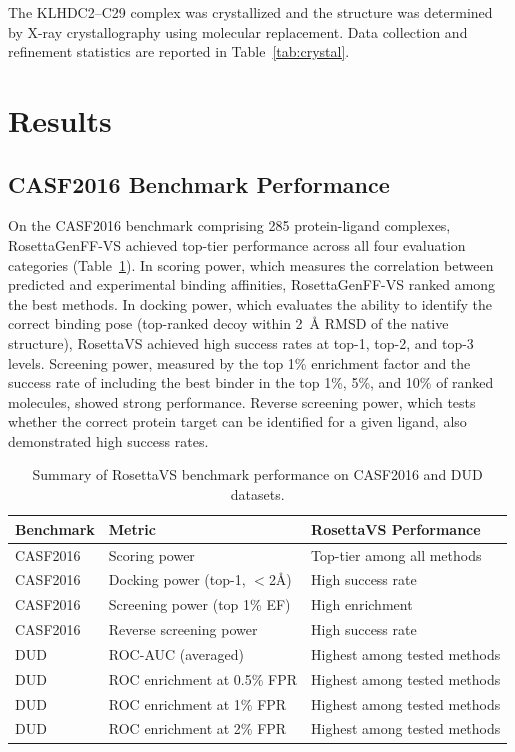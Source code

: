 \documentclass[12pt]{article}
\begin{document}
The KLHDC2--C29 complex was crystallized and the structure was determined by X-ray crystallography using molecular replacement. Data collection and refinement statistics are reported in Table~\ref{tab:crystal}.

\section{Results}

\subsection{CASF2016 Benchmark Performance}

On the CASF2016 benchmark comprising 285 protein-ligand complexes, RosettaGenFF-VS achieved top-tier performance across all four evaluation categories (Table~\ref{tab:casf}). In scoring power, which measures the correlation between predicted and experimental binding affinities, RosettaGenFF-VS ranked among the best methods. In docking power, which evaluates the ability to identify the correct binding pose (top-ranked decoy within 2~\AA{} RMSD of the native structure), RosettaVS achieved high success rates at top-1, top-2, and top-3 levels. Screening power, measured by the top 1\% enrichment factor and the success rate of including the best binder in the top 1\%, 5\%, and 10\% of ranked molecules, showed strong performance. Reverse screening power, which tests whether the correct protein target can be identified for a given ligand, also demonstrated high success rates.

\begin{table}[ht]
\centering
\caption{Summary of RosettaVS benchmark performance on CASF2016 and DUD datasets.}
\label{tab:casf}
\begin{tabular}{lll}
\toprule
\textbf{Benchmark} & \textbf{Metric} & \textbf{RosettaVS Performance} \\
\midrule
CASF2016 & Scoring power & Top-tier among all methods \\
CASF2016 & Docking power (top-1, $<$2\AA) & High success rate \\
CASF2016 & Screening power (top 1\% EF) & High enrichment \\
CASF2016 & Reverse screening power & High success rate \\
DUD & ROC-AUC (averaged) & Highest among tested methods \\
DUD & ROC enrichment at 0.5\% FPR & Highest among tested methods \\
DUD & ROC enrichment at 1\% FPR & Highest among tested methods \\
DUD & ROC enrichment at 2\% FPR & Highest among tested methods \\
\bottomrule
\end{tabular}
\end{table}
\end{document}
